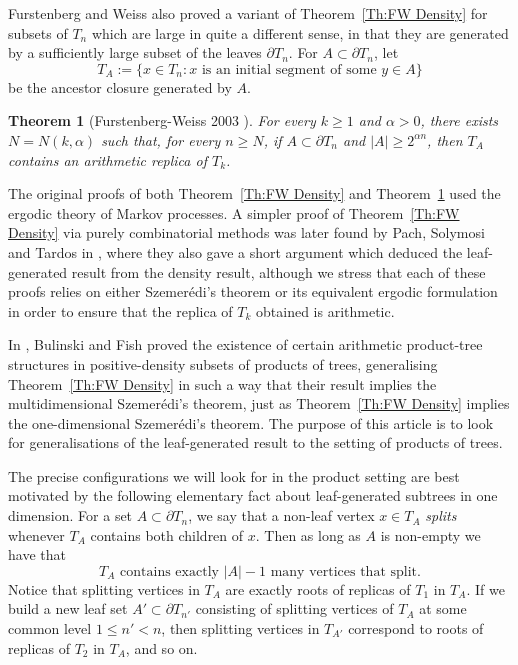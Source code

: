 \documentclass[11pt]{amsart}
\newcommand\labs[1]{\left\lvert#1\right\rvert}
\renewcommand{\leq}{\leqslant}
\renewcommand{\geq}{\geqslant}
\theoremstyle{plain}
\newtheorem{thm}{Theorem}[section]
\theoremstyle{definition}
\theoremstyle{remark}
\begin{document}
Furstenberg and Weiss also proved a variant of Theorem~\ref{Th:FW Density} for subsets of $T_n$ which are large in quite a different sense, in that they are generated by a sufficiently large subset of the leaves $\partial T_n$. For $A\subset\partial T_n$, let
\[T_A:=\{x\in T_n:x\text{ is an initial segment of some }y\in A\}
\]
be the ancestor closure generated by $A$.
\begin{thm}[Furstenberg-Weiss 2003 \cite{FW}]\label{Th:FW Leaf}
For every $k\geq1$ and $\alpha>0$, there exists $N=N(k,\alpha)$ such that, for every $n\geq N$, if $A\subset\partial T_n$ and $\labs{A}\geq2^{\alpha n}$, then $T_A$ contains an arithmetic replica of $T_k$.
\end{thm}
The original proofs of both Theorem~\ref{Th:FW Density} and Theorem~\ref{Th:FW Leaf} used the ergodic theory of Markov processes. A simpler proof of Theorem~\ref{Th:FW Density} via purely combinatorial methods was later found by Pach, Solymosi and Tardos in \cite{PST}, where they also gave a short argument which deduced the leaf-generated result from the density result, although we stress that each of these proofs relies on either Szemer\'{e}di's theorem or its equivalent ergodic formulation in order to ensure that the replica of $T_k$ obtained is arithmetic.

In \cite{BF}, Bulinski and Fish proved the existence of certain arithmetic product-tree structures in positive-density subsets of products of trees, generalising Theorem~\ref{Th:FW Density} in such a way that their result implies the multidimensional Szemer\'{e}di's theorem, just as Theorem~\ref{Th:FW Density} implies the one-dimensional Szemer\'{e}di's theorem. The purpose of this article is to look for generalisations of the leaf-generated result to the setting of products of trees.



The precise configurations we will look for in the product setting are best motivated by the following elementary fact about leaf-generated subtrees in one dimension. For a set $A\subset \partial T_n$, we say that a non-leaf vertex $x \in T_A$ \textit{splits} whenever $T_A$ contains both children of $x$. Then as long as $A$ is non-empty we have that
\begin{equation}\label{eq: Baby splitting lemma}
T_A \text{ contains exactly }\labs{A}-1 \text{ many vertices that split.}
\end{equation}
Notice that splitting vertices in $T_A$ are exactly roots of replicas of $T_1$ in $T_A$. If we build a new leaf set $A' \subset \partial T_{n'}$ consisting of splitting vertices of $T_A$ at some common level $1\leq n'<n$, then splitting vertices in $T_{A'}$ correspond to roots of replicas of $T_2$ in $T_A$, and so on.
\end{document}
